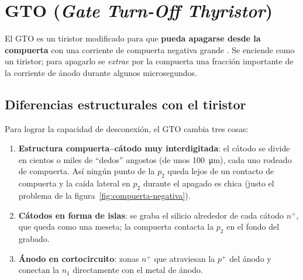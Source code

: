 \section{GTO (\emph{Gate Turn-Off Thyristor})}
\label{sec:gto}

El GTO es un tiristor modificado para que \textbf{pueda apagarse desde la compuerta} con una
corriente de compuerta negativa grande . Se enciende como un tiristor; para apagarlo se
\emph{extrae} por la compuerta una fracción importante de la corriente de ánodo durante algunos
microsegundos.

\subsection{Diferencias estructurales con el tiristor}

 Para lograr la capacidad de desconexión, el GTO cambia tres cosas:
\begin{enumerate}
  \item \textbf{Estructura compuerta--cátodo muy interdigitada}: el cátodo se divide en cientos o
  miles de ``dedos'' angostos (de unos \SI{100}{\micro m}), cada uno rodeado de compuerta. Así ningún
  punto de la $p_2$ queda lejos de un contacto de compuerta y la caída lateral en $p_2$ durante el
  apagado es chica (justo el problema de la figura~\ref{fig:compuerta-negativa}).
  \item \textbf{Cátodos en forma de islas}: se graba el silicio alrededor de cada cátodo $n^+$, que
  queda como una meseta; la compuerta contacta la $p_2$ en el fondo del grabado.
  \item \textbf{Ánodo en cortocircuito}: zonas $n^+$ que atraviesan la $p^+$ del ánodo y conectan la
  $n_1$ directamente con el metal de ánodo.
\end{enumerate}

